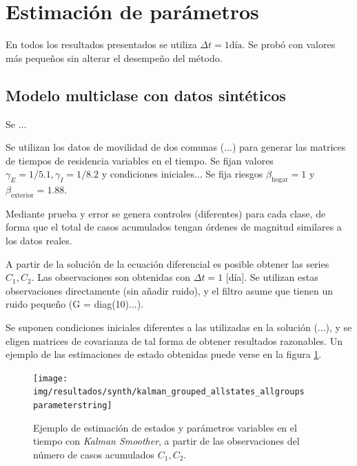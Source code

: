 \section{Estimación de parámetros}\label{sec:estimacion-results}

En todos los resultados presentados se utiliza \(\Delta t = 1 \text{día}\). Se probó con valores más pequeños sin alterar el desempeño del método.

\subsection{Modelo multiclase con datos sintéticos} \label{subsec:sintetico}

Se ...

Se utilizan los datos de movilidad de dos comunas (...) para generar las matrices de tiempos de residencia variables en el tiempo. Se fijan valores \(\gamma_E = 1/5.1, \gamma_I = 1/8.2\) y condiciones iniciales... Se fija riesgos \(\beta_{\text{hogar}} = 1\) y \(\beta_{\text{exterior}} = 1.88\). 

Mediante prueba y error se genera controles (diferentes) para cada clase, de forma que el total de casos acumulados tengan órdenes de magnitud similares a los datos reales.

A partir de la solución de la ecuación diferencial es posible obtener las series \(C_1, C_2\). Las observaciones son obtenidas con \(\Delta t = 1\) [día]. Se utilizan estas observaciones directamente (sin añadir ruido), y el filtro asume que tienen un ruido pequeño (G = diag(10)...). 

Se suponen condiciones iniciales diferentes a las utilizadas en la solución (...), y se eligen matrices de covarianza de tal forma de obtener resultados razonables. Un ejemplo de las estimaciones de estado obtenidas puede verse en la figura \ref{synth-all-nohigh}.



\begin{figure}[!h]
\centering
\texttt{[image: img/resultados/synth/kalman\_grouped\_allstates\_allgroups\\parameterstring]}
\caption{Ejemplo de estimación de estados y parámetros variables en el tiempo con \textit{Kalman Smoother}, a partir de las observaciones del número de casos acumulados \(C_1, C_2\).}
\label{synth-all-nohigh}
\end{figure}

